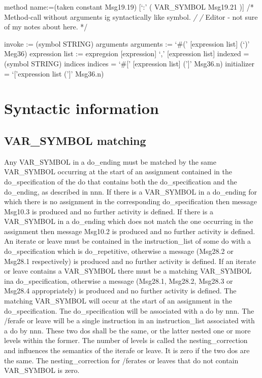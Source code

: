 method name:=(taken constant \textbar{} Msg19.19) {[}`:' ( VAR\_SYMBOL
\textbar{} Msg19.21 ){]} /* Method-call without arguments ig
syntactically like symbol. \emph{/ /} Editor - not sure of my notes
about here. */

invoke := (symbol \textbar{} STRING) arguments arguments := `\#('
{[}expression list{]} (`)' \textbar{} Meg36) expression list :=
expregsion \textbar{} {[}expression{]} `,' {[}expression list{]} indexed
= (symbol \textbar{} STRING) indices indices = `\#{[}' {[}expression
list{]} ('{]}' \textbar{} Msg36.n) initializer = `{[}'expression list
('{]}' \textbar{} Msg36.n)

\hypertarget{syntactic-information}{%
\section{Syntactic information}\label{syntactic-information}}

\hypertarget{var_symbol-matching}{%
\subsection{VAR\_SYMBOL matching}\label{var_symbol-matching}}

Any VAR\_SYMBOL in a do\_ending must be matched by the same VAR\_SYMBOL
occurring at the start of an assignment contained in the
do\_specification of the do that contains both the do\_specification and
the do\_ending, as described in nnn. If there is a VAR\_SYMBOL in a
do\_ending for which there is no assignment in the corresponding
do\_specification then message Msg10.3 is produced and no further
activity is defined. If there is a VAR\_SYMBOL in a do\_ending which
does not match the one occurring in the assignment then message Msg10.2
is produced and no further activity is defined. An iterate or leave must
be contained in the instruction\_list of some do with a
do\_specification which is do\_repetitive, otherwise a message (Msg28.2
or Msg28.1 respectively) is produced and no further activity is defined.
If an iterate or leave contains a VAR\_SYMBOL there must be a matching
VAR\_SYMBOL ina do\_specification, otherwise a message (Msg28.1,
Msg28.2, Msg28.3 or Msg28.4 appropriately) is produced and no further
activity is defined. The matching VAR\_SYMBOL will occur at the start of
an assignment in the do\_specification. Tne do\_specification will be
associated with a do by nnn. The /ferafe or leave will be a single
instruction in an instruction\_list associated with a do by nnn. These
two dos shall be the same, or the latter nested one or more levels
within the former. The number of levels is called the
nesting\_correction and influences the semantics of the iterafe or
leave. It is zero if the two dos are the same. The nesting\_correction
for /ferates or leaves that do not contain VAR\_SYMBOL is zero.


